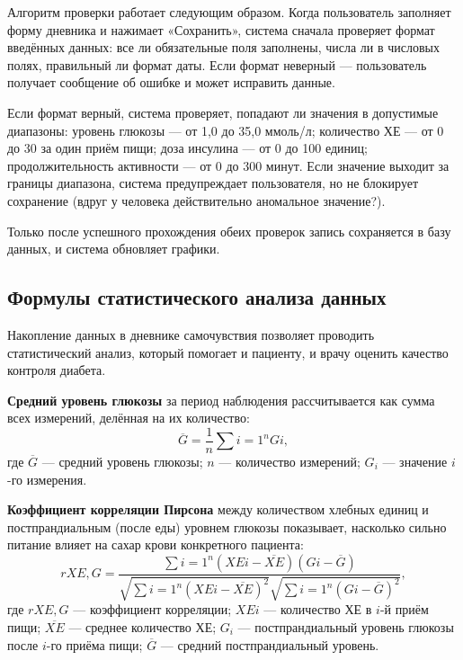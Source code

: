 \documentclass[14pt, a4paper]{extarticle}
\begin{document}
\medskip
\noindent Алгоритм проверки работает следующим образом. Когда пользователь заполняет форму дневника и нажимает «Сохранить», система сначала проверяет формат введённых данных: все ли обязательные поля заполнены, числа ли в числовых полях, правильный ли формат даты. Если формат неверный — пользователь получает сообщение об ошибке и может исправить данные.

\medskip
\noindent Если формат верный, система проверяет, попадают ли значения в допустимые диапазоны: уровень глюкозы — от 1,0 до 35,0 ммоль/л; количество ХЕ — от 0 до 30 за один приём пищи; доза инсулина — от 0 до 100 единиц; продолжительность активности — от 0 до 300 минут. Если значение выходит за границы диапазона, система предупреждает пользователя, но не блокирует сохранение (вдруг у человека действительно аномальное значение?).

\medskip
\noindent Только после успешного прохождения обеих проверок запись сохраняется в базу данных, и система обновляет графики.


\subsection{Формулы статистического анализа данных}

\noindent Накопление данных в дневнике самочувствия позволяет проводить статистический анализ, который помогает и пациенту, и врачу оценить качество контроля диабета.

\medskip
\noindent \textbf{Средний уровень глюкозы} за период наблюдения рассчитывается как сумма всех измерений, делённая на их количество:
\begin{equation}
\overline{G}=\frac{1}{n}\sum{i=1}^{n}Gi,
\end{equation}
где $\overline{G}$ — средний уровень глюкозы; $n$ — количество измерений; $G_i$ — значение $i$-го измерения.

\vskip 5cm
\noindent \textbf{Коэффициент корреляции Пирсона} между количеством хлебных единиц и постпрандиальным (после еды) уровнем глюкозы показывает, насколько сильно питание влияет на сахар крови конкретного пациента:
\begin{equation}
r{XE,G}=\frac{\sum{i=1}^{n}(XEi-\overline{XE})(Gi-\overline{G})}
{\sqrt{\sum{i=1}^{n}(XEi-\overline{XE})^2}\sqrt{\sum{i=1}^{n}(Gi-\overline{G})^2}},
\end{equation}
где $r{XE,G}$ — коэффициент корреляции; $XEi$ — количество ХЕ в $i$-й приём пищи; $\overline{XE}$ — среднее количество ХЕ; $G_i$ — постпрандиальный уровень глюкозы после $i$-го приёма пищи; $\overline{G}$ — средний постпрандиальный уровень.
\end{document}
